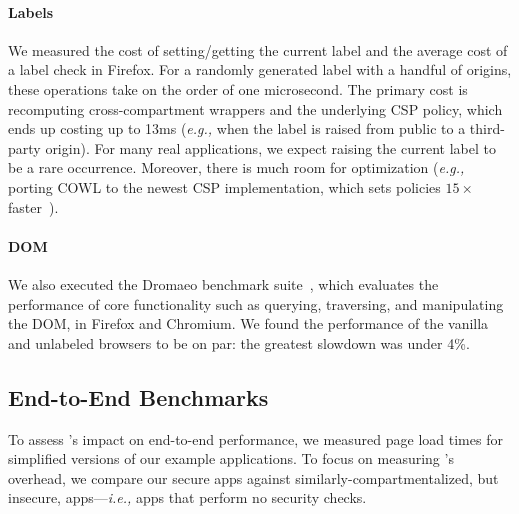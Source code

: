 \paragraph{Labels} We measured the cost of setting/getting the current
label and the average cost of a label check in Firefox.
%
For a randomly generated label with a handful of origins, these
operations take on the order of one microsecond.
%
The primary cost is recomputing cross-compartment wrappers and
the underlying CSP policy, which ends up costing up to 13ms (\emph{e.g.,} when
the label is raised from public to a third-party origin).
%
For many real applications, we expect raising the current label
to be a rare occurrence.
%
Moreover, there is much room for optimization (\emph{e.g.,}
porting COWL to the newest CSP implementation, which sets
policies $15\times$ faster~\cite{faster-csp}).
 
\paragraph{DOM} We also executed the Dromaeo benchmark suite~\cite{dromaeo},
which evaluates the performance of core functionality such as
querying, traversing, and manipulating the DOM, in Firefox and
Chromium. We found the performance of the vanilla and unlabeled
browsers to be on par: the greatest slowdown was under 4\%.

\subsection{End-to-End Benchmarks}
\label{sec:eval:macro}

To assess \sys{}'s impact on end-to-end performance, we measured
page load times for simplified versions of our example applications.
%
To focus on measuring \sys{}'s overhead, we compare our secure apps
against similarly-compartmentalized, but insecure, apps---\emph{i.e.,}
apps that perform no security checks.
%

